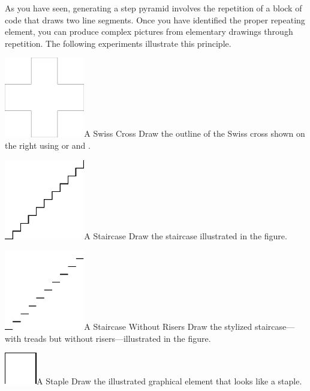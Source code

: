 \documentclass[a4paper,10pt,twoside]{book}
\begin{document}
As you have seen, generating a step pyramid involves the repetition of a block of code that 
draws two line segments. Once you have identified the proper repeating element, you can 
produce complex pictures from elementary drawings through repetition. The following 
experiments illustrate this principle. 

\begin{exofigwithsizeandtitle}[0.65]{\includegraphics[width=3.5cm]{loopCross}}{A Swiss Cross}
Draw the outline of the Swiss cross shown on the right using  or  and .
\end{exofigwithsizeandtitle}

\begin{exofigwithsizeandtitle}[0.65]{\includegraphics[width=3.5cm]{loopStair}}{A Staircase}
Draw the staircase illustrated in the figure. 
\end{exofigwithsizeandtitle}

\begin{exofigwithsizeandtitle}[0.65]{\includegraphics[width=3.5cm]{loopStylisedStair}}{A Staircase Without Risers} 
Draw the stylized staircase—with treads but without risers—illustrated in the figure.
\end{exofigwithsizeandtitle}

\begin{exofigwithsizeandtitle}[0.65]{\includegraphics[width=.5cm]{loopSimpleElement}}{A Staple} 
Draw the illustrated graphical element that looks like a staple.
\end{exofigwithsizeandtitle}
\end{document}
